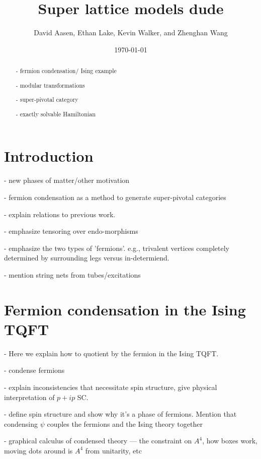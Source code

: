 \documentclass[12pt,a4paper]{article}
\begin{document}
\title{Super lattice models dude}
\author{David Aasen, Ethan Lake, Kevin Walker, and Zhenghan Wang}

\date{\today}

\maketitle

\begin{abstract}
- fermion condensation/ Ising example

- modular transformations

- super-pivotal category

- exactly solvable Hamiltonian
\end{abstract}

\tableofcontents

\section{Introduction}
- new phases of matter/other motivation

- fermion condensation as a method to generate super-pivotal categories

- explain relations to previous work. 

- emphasize tensoring over endo-morphisms

- emphasize the two types of 'fermions'. e.g., trivalent vertices completely determined by surrounding legs versus in-determiend.

-  mention string nets from tubes/excitations

\section{Fermion condensation in the Ising TQFT}

- Here we explain how to quotient by the fermion in the Ising TQFT. 

- condense fermions

- explain inconsistencies that necessitate spin structure, give physical interpretation of $p+ip$ SC.

- define spin structure and show why it's a phase of fermions. Mention that condensing $\psi$ couples the fermions and the Ising theory together 

- graphical calculus of condensed theory --- the constraint on $A^4$, how boxes work, moving dots around is $A^4$ from unitarity, etc
\end{document}
